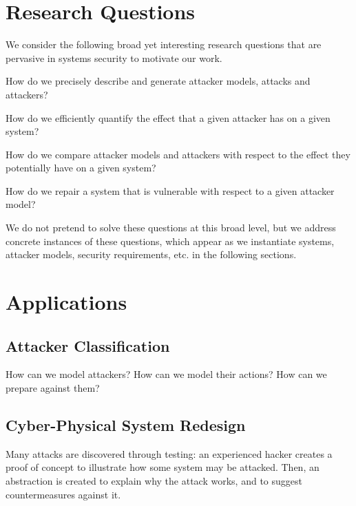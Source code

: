 \section{Research Questions}
We consider the following broad yet interesting research questions that are pervasive in systems security to motivate our work.
\begin{question}
\label{que:AttackerModel}
How do we precisely describe and generate attacker models, attacks and attackers?
\end{question}
\begin{question}
\label{que:Quantification}
How do we efficiently quantify the effect that a given attacker has on a given system? 
\end{question}
\begin{question}
\label{que:Classification}
How do we compare attacker models and attackers with respect to the effect they potentially have on a given system?
\end{question}
\begin{question}
\label{que:Repair}
How do we repair a system that is vulnerable with respect to a given attacker model?
\end{question}
We do not pretend to solve these questions at this broad level, but we address concrete instances of these questions, which appear as we instantiate systems, attacker models, security requirements, etc. in the following sections.
\section{Applications}
\subsection{Attacker Classification}
How can we model attackers? How can we model their actions? How can we prepare against them?
\subsection{Cyber-Physical System Redesign}
Many attacks are discovered through testing: an experienced hacker creates a proof of concept to illustrate how some system may be attacked. Then, an abstraction is created to explain why the attack works, and to suggest countermeasures against it. 
